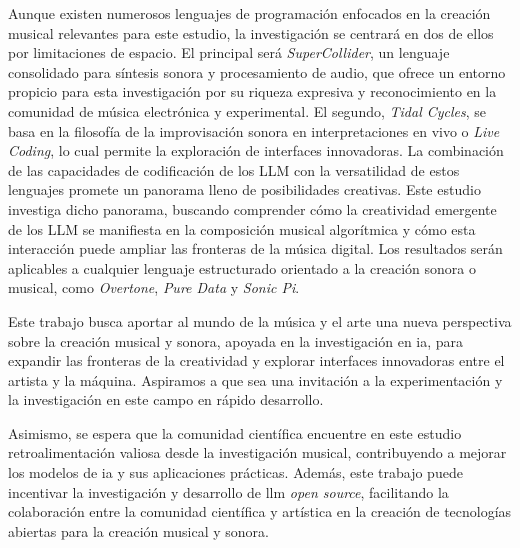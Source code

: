 Aunque existen numerosos lenguajes de programación enfocados en la creación musical relevantes para este estudio, la investigación se centrará en dos de ellos por limitaciones de espacio. El principal será \emph{SuperCollider}, un lenguaje consolidado para síntesis sonora y procesamiento de audio, que ofrece un entorno propicio para esta investigación por su riqueza expresiva y reconocimiento en la comunidad de música electrónica y experimental. El segundo, \emph{Tidal Cycles}, se basa en la filosofía de la improvisación sonora en interpretaciones en vivo o \emph{Live Coding}, lo cual permite la exploración de interfaces innovadoras. La combinación de las capacidades de codificación de los LLM con la versatilidad de estos lenguajes promete un panorama lleno de posibilidades creativas. Este estudio investiga dicho panorama, buscando comprender cómo la creatividad emergente de los LLM se manifiesta en la composición musical algorítmica y cómo esta interacción puede ampliar las fronteras de la música digital. Los resultados serán aplicables a cualquier lenguaje estructurado orientado a la creación sonora o musical, como \emph{Overtone}, \emph{Pure Data} y \emph{Sonic Pi}.

Este trabajo busca aportar al mundo de la música y el arte una nueva perspectiva sobre la creación musical y sonora, apoyada en la investigación en \gls{ia}, para expandir las fronteras de la creatividad y explorar interfaces innovadoras entre el artista y la máquina. Aspiramos a que sea una invitación a la experimentación y la investigación en este campo en rápido desarrollo.

Asimismo, se espera que la comunidad científica encuentre en este estudio retroalimentación valiosa desde la investigación musical, contribuyendo a mejorar los modelos de \gls{ia} y sus aplicaciones prácticas. Además, este trabajo puede incentivar la investigación y desarrollo de \gls{llm} \emph{open source}, facilitando la colaboración entre la comunidad científica y artística en la creación de tecnologías abiertas para la creación musical y sonora.